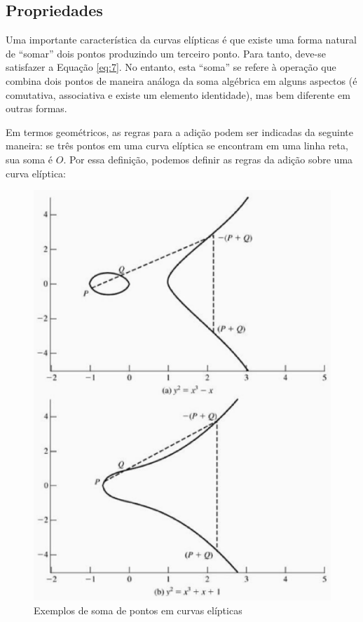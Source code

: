 \subsection{Propriedades}
Uma importante característica da curvas elípticas é que existe uma forma natural de ``somar'' dois pontos produzindo um terceiro ponto. Para tanto, deve-se satisfazer a Equação \ref{eq:7}. No entanto, esta ``soma'' se refere à operação que combina dois pontos de maneira análoga da soma algébrica em alguns aspectos (é comutativa, associativa e existe um elemento identidade), mas bem diferente em outras formas.

Em termos geométricos, as regras para a adição podem ser indicadas da seguinte maneira: se três pontos em uma curva elíptica se encontram em uma linha reta, sua soma é \(O\). Por essa definição, podemos definir as regras da adição sobre uma curva elíptica:

\begin{figure}[h]
\centering
\includegraphics[scale=0.5, bb=0 0 484 636]{figuras/pontos_curva.eps}
\caption{Exemplos de soma de pontos em curvas elípticas}
\label{fig:pontos}
\end{figure}

